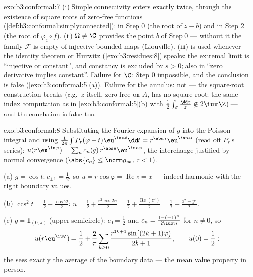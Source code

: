 \begin{solution}{exo:b3:conformal:7}
(i) Simple connectivity enters exactly twice, through the
existence of  square roots of zero-free functions
(\cref{def:b3:conformal:simplyconnected}): in Step 0 (the root
of $z - b$) and in Step 2 (the root of $\varphi_a\circ f$).
(ii) $\Omega \neq \C$ provides the point $b$ of Step 0 ---
without it the family $\mathcal F$ is empty of injective
bounded maps (Liouville). (iii)  is used whenever
the identity theorem or Hurwitz (\cref{exo:b3:residues:8})
speaks: the extremal limit is ``injective or constant'', and
constancy is excluded by $s > 0$; also in ``zero derivative
implies constant''. Failure for $\C$: Step 0 impossible, and
the conclusion is false (\cref{exo:b3:conformal:5}(a)).
Failure for the annulus: not  --- the
square-root construction breaks (e.g.\ $z$ itself, zero-free
on $A$, has no  square root: the same index
computation as in \cref{exo:b3:conformal:5}(b) with
$\frac12\int_\sigma\frac{\dd z}z \notin 2\iu\pi\Z$) --- and
the conclusion is false too.
\end{solution}

\begin{solution}{exo:b3:conformal:8}
Substituting the Fourier expansion of $g$ into the Poisson
integral and using
$\frac1{2\pi}\int P_r(\varphi - t)\eu^{\iu nt}\dd t =
r^{\abs n}\eu^{\iu n\varphi}$ (read off $P_r$'s series):
$u(r\eu^{\iu\varphi}) = \sum_nc_n(g)\,r^{\abs
n}\eu^{\iu n\varphi}$, the interchange justified by normal
convergence ($\abs{c_n} \leq \norm g_\infty$, $r < 1$).

(a) $g = \cos t$: $c_{\pm1} = \frac12$, so $u =
r\cos\varphi = \operatorname{Re}z = x$ --- indeed harmonic
with the right boundary values.

(b) $\cos^2t = \frac12 + \frac{\cos 2t}2$: $u = \frac12 +
\frac{r^2\cos2\varphi}2 = \frac12 +
\frac{\operatorname{Re}(z^2)}2 = \frac12 + \frac{x^2 -
y^2}{2}$.

(c) $g = \mathbf 1_{(0,\pi)}$ (upper semicircle): $c_0 =
\frac12$ and $c_n = \frac{1 - (-1)^n}{2\iu\pi n}$ for $n \neq
0$, so
\[
u(r\eu^{\iu\varphi}) = \frac12 + \frac2\pi\sum_{k\geq0}
\frac{r^{2k+1}\sin\bigl((2k+1)\varphi\bigr)}{2k + 1},
\qquad u(0) = \frac12 :
\]
the  sees exactly the average of the boundary data ---
the mean value property in person.
\end{solution}

